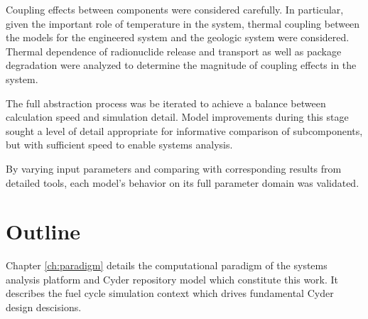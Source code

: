 
Coupling effects between components were considered carefully.  In 
particular, given the important role of temperature in the system, thermal 
coupling between the models for the engineered system and the geologic system 
were considered. Thermal dependence of radionuclide release and transport as 
well as package degradation were analyzed to determine the 
magnitude of coupling effects in the system.


The full abstraction process was be iterated to achieve a balance between 
calculation speed and simulation detail. Model improvements during this stage 
sought a level of detail appropriate for informative comparison of subcomponents, but 
with sufficient speed to enable systems analysis. 


By varying input parameters and comparing with corresponding results from 
detailed tools, each model's behavior on its full parameter domain was 
validated.


\section{Outline}




Chapter \ref{ch:paradigm} details the computational paradigm of the \Cyclus 
systems analysis platform and Cyder repository model which constitute this work. 
It describes the \Cyclus fuel cycle simulation context which drives fundamental 
Cyder design descisions. 

